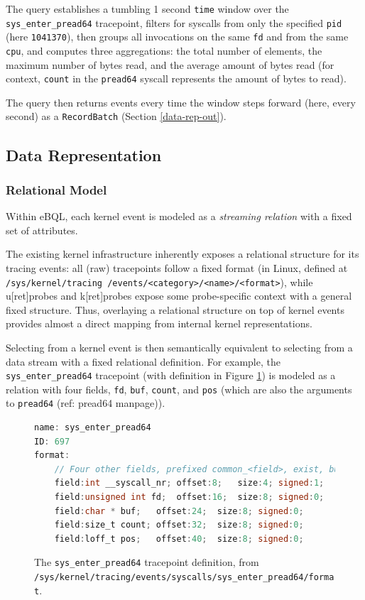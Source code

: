 The query establishes a tumbling 1 second \texttt{time} window over the \texttt{sys\_enter\_pread64}
tracepoint, filters for syscalls from only the specified \texttt{pid} (here \texttt{1041370}), then
groups all invocations on the same \texttt{fd} and from the same \texttt{cpu}, and computes three
aggregations: the total number of elements, the maximum number of bytes read, and the average amount
of bytes read (for context, \texttt{count} in the \texttt{pread64} syscall represents the amount of
bytes to read).

The query then returns events every time the window steps forward (here, every second) as a
\texttt{RecordBatch} (Section \ref{data-rep-out}).

\subsection{Data Representation}
\label{data-rep}

\subsubsection{Relational Model}
Within eBQL, each kernel event is modeled as a \textit{streaming relation} with a fixed set of
attributes.

The existing kernel infrastructure inherently exposes a relational structure for its tracing events:
all (raw) tracepoints follow a fixed format (in Linux, defined at
\texttt{/sys/kernel/tracing /events/<category>/<name>/<format>}), while u[ret]probes and k[ret]probes
expose some probe-specific context with a general fixed structure. Thus, overlaying a relational
structure on top of kernel events provides almost a direct mapping from internal kernel
representations.

Selecting from a kernel event is then semantically equivalent to selecting from a data stream with a
fixed relational definition. For example, the \texttt{sys\_enter\_pread64} tracepoint (with
definition in Figure \ref{code:pread64-format}) is modeled as a relation with four fields,
\texttt{fd}, \texttt{buf}, \texttt{count}, and \texttt{pos} (which are also the arguments to
\texttt{pread64} (ref: pread64 manpage)). 

\begin{figure}[htpb]
\begin{lstlisting}[language=C]
name: sys_enter_pread64
ID: 697
format:
    // Four other fields, prefixed common_<field>, exist, but are not available to eBPF programs attached to tracepoints, and are thus omitted.
    field:int __syscall_nr; offset:8;   size:4; signed:1;
    field:unsigned int fd;  offset:16;  size:8; signed:0;
    field:char * buf;   offset:24;  size:8; signed:0;
    field:size_t count; offset:32;  size:8; signed:0;
    field:loff_t pos;   offset:40;  size:8; signed:0;
\end{lstlisting}
\caption{The \texttt{sys\_enter\_pread64} tracepoint definition, from
\texttt{/sys/kernel/tracing/events/syscalls/sys\_enter\_pread64/format}.}
\label{code:pread64-format}
\end{figure}

